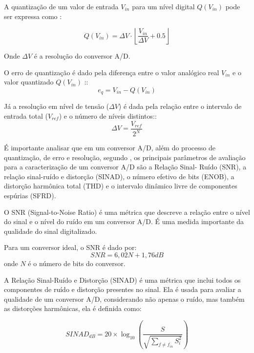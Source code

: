 A quantização de um valor de entrada \( V_{in} \) para um nível digital \(Q(V_{in})\) pode ser expressa como \cite{ieee_adc}:

\begin{equation} \label{eq:ad1}
Q(V_{in}) = \Delta V \cdot \left\lfloor \frac{V_{in}}{\Delta V} + 0.5 \right\rfloor
\end{equation}

Onde \( \Delta V \) é a resolução do conversor A/D.

O erro de quantização é dado pela diferença entre o valor analógico real \( V_{in} \) e o valor quantizado \( Q(V_{in}) \) \cite{ieee_adc}::
\begin{equation} \label{eq:ad2}
e_q = V_{in} - Q(V_{in})
\end{equation}

Já a resolução em nível de tensão (\( \Delta V \)) é dada pela relação entre o intervalo de entrada total (\( V_{ref} \)) e o número de níveis distintos\cite{ieee_adc}::
\begin{equation} \label{eq:ad3}
\Delta V = \frac{V_{ref}}{2^N}
\end{equation}

É importante analisar que em um conversor A/D, além do processo de quantização, de erro e resolução, segundo \cite{ieee_adc}, os principais parâmetros de avaliação para a caracterização de um conversor A/D são a Relação Sinal- Ruído (SNR), a relação sinal-ruído e distorção (SINAD), o número efetivo de bits (ENOB), a distorção harmônica total (THD) e o intervalo dinâmico livre de componentes espúrias (SFRD).

O SNR (Signal-to-Noise Ratio) é uma métrica que descreve a relação entre o nível do sinal e o nível do ruído em um conversor A/D. É uma medida importante da qualidade do sinal digitalizado.

Para um conversor ideal, o SNR é dado por:
\begin{equation} \label{eq:SNR}
SNR= 6,02N + 1,76dB
\end{equation}
onde \( N \) é o número de bits do conversor.

A Relação Sinal-Ruído e Distorção (SINAD) é uma métrica que inclui todos os componentes de ruído e distorção presentes no sinal. Ela é usada para avaliar a qualidade de um conversor A/D, considerando não apenas o ruído, mas também as distorções harmônicas, ela é definida como\cite{ieee_adc}:

\begin{equation}\label{eq:SINAD}
SINAD_{dB} = 20 \times \log_{10} \left( \frac{S}{\sqrt{\sum_{f \ne f_{in}} S_i^2}} \right)
\end{equation}

